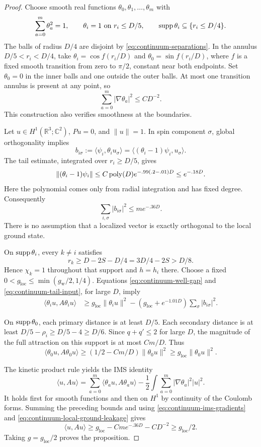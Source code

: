 \begin{proof}
Choose smooth real functions \(\theta_0,\theta_1,\ldots,\theta_m\)
with
\[
 \sum_{a=0}^m\theta_a^2=1,\qquad
 \theta_i=1\ \text{on }r_i\le D/5,\qquad
 \operatorname{supp}\theta_i\subseteq\{r_i\le D/4\}.
\]
The balls of radius \(D/4\) are disjoint by
\eqref{eq:continuum-separations}.  In the annulus
\(D/5<r_i<D/4\), take
\(\theta_i=\cos f(r_i/D)\) and
\(\theta_0=\sin f(r_i/D)\), where \(f\) is a fixed smooth
transition from zero to \(\pi/2\), constant near both endpoints.
Set \(\theta_0=0\) in the inner balls and one outside the outer
balls.  At most one transition annulus is present at any point,
so
\begin{equation}
 \sum_{a=0}^m|\nabla\theta_a|^2\le CD^{-2}.
 \label{eq:continuum-ims-gradients}
\end{equation}
This construction also verifies smoothness at the boundaries.

Let \(u\in H^1(\mathbb R^3;\mathbb C^2)\), \(Pu=0\), and
\(\|u\|=1\).  In spin component \(\sigma\), global orthogonality
implies
\[
 b_{i\sigma}:=\langle\psi_i,\theta_i u_\sigma\rangle
 =\langle(\theta_i-1)\psi_i,u_\sigma\rangle.
\]
The tail estimate, integrated over \(r_i\ge D/5\), gives
\[
 \|(\theta_i-1)\psi_i\|
 \le C\operatorname{poly}(D)e^{-.99(.2-.01)D}
 \le e^{-.18D}.
\]
Here the polynomial comes only from radial integration and has
fixed degree.  Consequently
\begin{equation}
 \sum_{i,\sigma}|b_{i\sigma}|^2\le me^{-.36D}.
 \label{eq:continuum-local-ground-leakage}
\end{equation}
There is no assumption that a localized vector is exactly
orthogonal to the local ground state.

On \(\operatorname{supp}\theta_i\), every \(k\ne i\) satisfies
\[
 r_k\ge D-2S-D/4=3D/4-2S>D/8.
\]
Hence \(\chi_k=1\) throughout that support and \(h=h_i\) there.
Choose a fixed
\(0<g_{\mathrm{loc}}\le\min(g_{\mathrm w}/2,1/4)\).
Equations \eqref{eq:continuum-well-gap} and
\eqref{eq:continuum-tail-input}, for large \(D\), imply
\begin{align*}
 \langle\theta_i u,A\theta_i u\rangle
 &\ge g_{\mathrm{loc}}\|\theta_i u\|^2
   -(g_{\mathrm{loc}}+e^{-1.01D})\sum_\sigma|b_{i\sigma}|^2 .
\end{align*}

On \(\operatorname{supp}\theta_0\), each primary distance is at least \(D/5\).
Each secondary distance is at least
\(D/5-\rho_i\ge D/5-4\ge D/6\).
Since \(q+q'\le2\) for large \(D\), the magnitude of the full
attraction on this support is at most \(Cm/D\).  Thus
\[
 \langle\theta_0u,A\theta_0u\rangle
 \ge(1/2-Cm/D)\|\theta_0u\|^2
 \ge g_{\mathrm{loc}}\|\theta_0u\|^2.
\]

The kinetic product rule yields the IMS identity
\[
 \langle u,Au\rangle
 =\sum_{a=0}^m\langle\theta_au,A\theta_au\rangle
 -\frac12\int\sum_{a=0}^m|\nabla\theta_a|^2|u|^2.
\]
It holds first for smooth functions and then on \(H^1\) by
continuity of the Coulomb forms.  Summing the preceding bounds
and using \eqref{eq:continuum-ims-gradients} and
\eqref{eq:continuum-local-ground-leakage} gives
\[
 \langle u,Au\rangle
 \ge g_{\mathrm{loc}}-Cme^{-.36D}-CD^{-2}\ge g_{\mathrm{loc}}/2.
\]
Taking \(g=g_{\mathrm{loc}}/2\) proves the proposition.
\end{proof}

